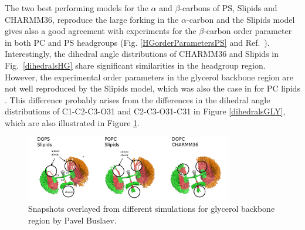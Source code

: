 \documentclass[aps,prl,superscriptaddress,twocolumn]{revtex4}
\begin{document}
The two best performing models for the $\alpha$ and $\beta$-carbons of
PS, Slipids and CHARMM36, reproduce the large forking in the $\alpha$-carbon
and the Slipids model gives also a good agreement with experiments for
the $\beta$-carbon order parameter in both PC and PS headgroups
(Fig. \ref{HGorderParametersPS} and Ref.~).
Interestingly, the dihedral angle distributions of CHARMM36
and Slipids in Fig.~\ref{dihedralsHG} share significant similarities
in the headgroup region. However, the experimental order parameters in the
glycerol backbone region are not well reproduced by the Slipids model,
which was also the case in for PC lipids \cite{botan15}.
This difference probably arises from the differences in
the dihedral angle distributions of C1-C2-C3-O31 and C2-C3-O31-C31
in Figure \ref{dihedralsGLY}, which are also illustrated in
Figure \ref{glycerol_buslaev}. 





\begin{figure}[]
  \centering
  \includegraphics[width=9.0cm]{../Figs/glycerol_buslaev.png}
  \caption{\label{glycerol_buslaev}
    Snapshots overlayed from different simulations for glycerol backbone region
    by Pavel Buslaev.
  }
\end{figure}
\end{document}
